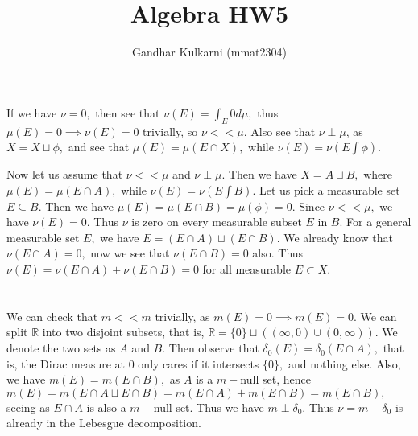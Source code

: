 \documentclass{article}
\title{Algebra HW5} %
\author{Gandhar Kulkarni (mmat2304)} %
\date{} %
\begin{document}
\maketitle %


\section{} %
If we have $\nu=0,$ then see that $\nu(E)=\int_{E}0 d\mu,$ thus $\mu(E)=0 \implies \nu(E)=0$ trivially, so $\nu << \mu.$ Also see that $\nu \perp \mu$, as 
$X= X \sqcup \phi,$ and see that $\mu(E)=\mu(E \cap X),$ while $\nu(E)=\nu(E \int \phi).$ 

Now let us assume that $\nu << \mu$ and $\nu \perp \mu.$ Then we have $X=A \sqcup B,$ where $\mu(E)=\mu(E \cap A),$ while $\nu(E)=\nu(E \int B).$ Let us 
pick a measurable set $E \subseteq B.$ Then we have $\mu(E)=\mu(E \cap B)=\mu(\phi)=0.$ Since $\nu << \mu,$ we have $\nu(E)=0.$ Thus $\nu$ is zero on every 
measurable subset $E$ in $B.$ For a general measurable set $E,$ we have $E=(E \cap A) \sqcup (E \cap B).$ We already know that $\nu(E\cap A)=0,$ now we see 
that $\nu(E \cap B)=0$ also. Thus $\nu(E)=\nu(E \cap A)+\nu(E \cap B)=0$ for all measurable $E \subset X.$
\section{} %
\section{} %
We can check that $m << m$ trivially, as $m(E)=0 \implies m(E)=0.$ We can split $\mathbb{R}$ into two disjoint subsets, that is, $\mathbb{R}= \{0\} \sqcup 
((\infty,0)\cup (0,\infty)).$ We denote the two sets as $A$ and $B.$ Then observe that $\delta_0(E)= \delta_0(E \cap A),$ that is, the Dirac measure at $0$ 
only cares if it intersects $\{0\},$ and nothing else. Also, we have $m(E)=m(E \cap B),$ as $A$ is a $m-$null set, hence $m(E)=m(E\cap A \sqcup E \cap 
B)=m(E \cap A)+ m(E \cap B)=m(E \cap B),$ seeing as $E \cap A$ is also a $m-$null set. Thus we have $m \perp \delta_0.$ Thus $\nu=m+\delta_0$ is already in 
the Lebesgue decomposition. 
\end{document}
